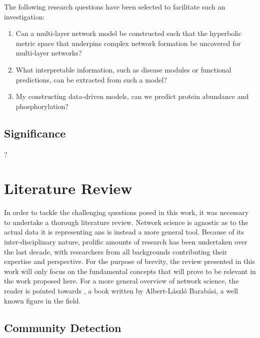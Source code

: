 \documentclass{report}
\begin{document}
	The following research questions have been selected to facilitate such an investigation:
	
	\begin{enumerate}
		\item Can a multi-layer network model be constructed such that the hyperbolic metric space that underpins complex network formation be uncovered for multi-layer networks?
		\item What interpretable information, such as disease modules or functional predictions, can be extracted from such a model?
		\item My constructing data-driven models, can we predict protein abundance and phosphorylation?
	\end{enumerate}
	
	
	\section{Significance}
	?
	
	
	
	
	\chapter{Literature Review}
	
	In order to tackle the challenging questions posed in this work, it was necessary to undertake a thorough literature review. Network science is agnostic as to the actual data it is representing ans is instead a more general tool. Because of its inter-disciplinary nature, prolific amounts of research has been undertaken over the last decade, with researchers from all backgrounds contributing their expertise and perspective. For the purpose of brevity, the review presented in this work will only focus on the fundamental concepts that will prove to be relevant in the work proposed here. For a more general overview of network science, the reader is pointed towards \cite{barabasi2002linked}, a book written by Albert-L{\'a}szl{\'o} Barab{\'a}si, a well known figure in the field.
	
	\section{Community Detection}
	
\end{document}

